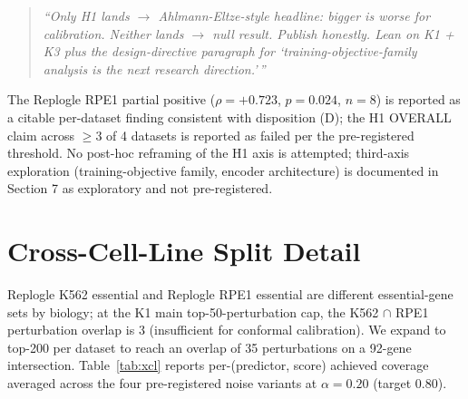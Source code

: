 \documentclass{article}
\begin{document}
\begin{quote}
\textit{``Only H1 lands $\to$ Ahlmann-Eltze-style headline: bigger is worse for calibration. Neither lands $\to$ null result. Publish honestly. Lean on K1 + K3 plus the design-directive paragraph for `training-objective-family analysis is the next research direction.'\,''}
\end{quote}

The Replogle RPE1 partial positive ($\rho = +0.723$, $p = 0.024$, $n = 8$) is reported as a citable per-dataset finding consistent with disposition (D); the H1 OVERALL claim across $\geq 3$ of 4 datasets is reported as failed per the pre-registered threshold. No post-hoc reframing of the H1 axis is attempted; third-axis exploration (training-objective family, encoder architecture) is documented in Section 7 as exploratory and not pre-registered.

\section{Cross-Cell-Line Split Detail}
\label{app:xcl}

Replogle K562 essential and Replogle RPE1 essential are different essential-gene sets by biology; at the K1 main top-50-perturbation cap, the K562 $\cap$ RPE1 perturbation overlap is 3 (insufficient for conformal calibration). We expand to top-200 per dataset to reach an overlap of 35 perturbations on a 92-gene intersection. Table~\ref{tab:xcl} reports per-(predictor, score) achieved coverage averaged across the four pre-registered noise variants at $\alpha = 0.20$ (target $0.80$).
\end{document}
